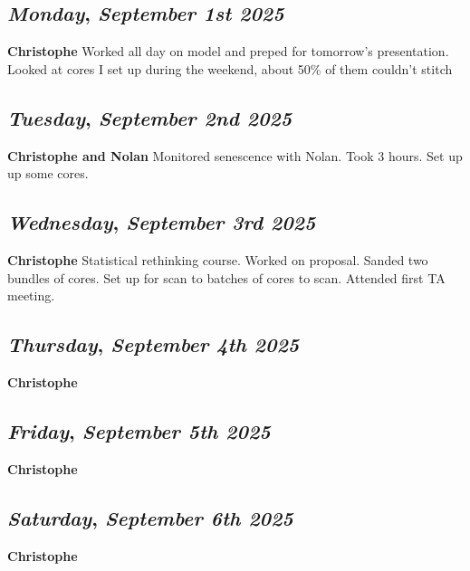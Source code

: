 \begin{center}
\section*{\month}
\end{center}

\def\day{\textit{September 1st 2025}}
\def\weekday{\textit{Monday}}
\subsection*{\weekday, \day}
\textbf {Christophe}
Worked all day on model and preped for tomorrow's presentation. Looked at cores I set up during the weekend, about 50\% of them couldn't stitch

\def\day{\textit{September 2nd 2025}}
\def\weekday{\textit{Tuesday}}
\subsection*{\weekday, \day}
\textbf {Christophe and Nolan}
Monitored senescence with Nolan. Took 3 hours. Set up up some cores.

\def\day{\textit{September 3rd 2025}}
\def\weekday{\textit{Wednesday}}
\subsection*{\weekday, \day}
\textbf {Christophe}
Statistical rethinking course. Worked on proposal. Sanded two bundles of cores. Set up for scan to batches of cores to scan. Attended first TA meeting. 

\def\day{\textit{September 4th 2025}}
\def\weekday{\textit{Thursday}}
\subsection*{\weekday, \day}
\textbf {Christophe}

\def\day{\textit{September 5th 2025}}
\def\weekday{\textit{Friday}}
\subsection*{\weekday, \day}
\textbf {Christophe}

\def\day{\textit{September 6th 2025}}
\def\weekday{\textit{Saturday}}
\subsection*{\weekday, \day}
\textbf {Christophe}

